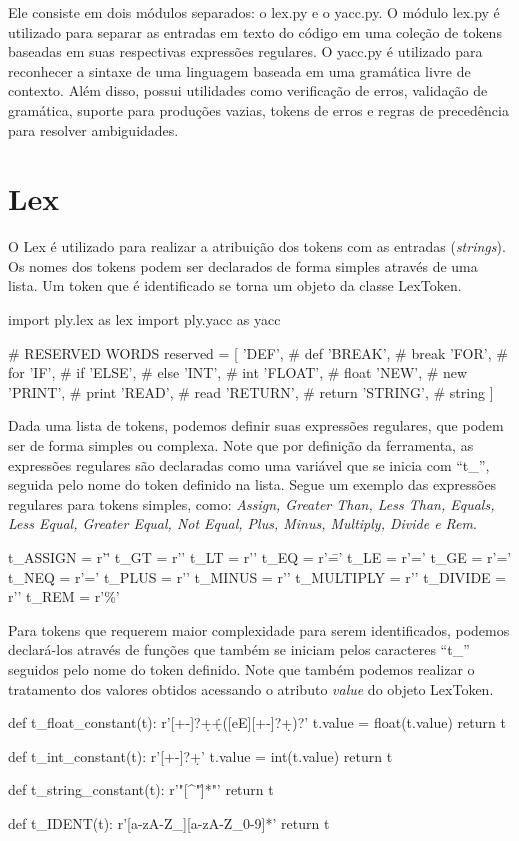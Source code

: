 \documentclass[
	12pt,				%
	openright,			%
	twoside,			%
	a4paper,			%
	english,			%
	french,				%
	spanish,			%
	brazil				%
	]{abntex2}
\begin{document}
Ele consiste em dois módulos separados: o lex.py e o yacc.py. O módulo lex.py é utilizado
para separar as entradas em texto do código em uma coleção de tokens baseadas em suas respectivas 
expressões regulares. O yacc.py é utilizado para reconhecer a sintaxe de uma linguagem 
baseada em uma gramática livre de contexto. Além disso, possui utilidades como verificação
de erros, validação de gramática, suporte para produções vazias, tokens de erros e regras de
precedência para resolver ambiguidades.

\section{Lex}
O Lex é utilizado para realizar a atribuição dos tokens com as entradas (\emph{strings}).
Os nomes dos tokens podem ser declarados de forma simples através de uma lista. Um token
que é identificado se torna um objeto da classe LexToken.
\begin{python}
import ply.lex as lex
import ply.yacc as yacc

# RESERVED WORDS
reserved = [
    'DEF',         # def
    'BREAK',       # break
    'FOR',         # for
    'IF',          # if
    'ELSE',        # else
    'INT',         # int
    'FLOAT',       # float
    'NEW',         # new
    'PRINT',       # print
    'READ',        # read
    'RETURN',      # return
    'STRING',      # string
]
\end{python}

	Dada uma lista de tokens, podemos definir suas expressões regulares, que podem
ser de forma simples ou complexa. Note que por definição da ferramenta,
as expressões regulares são declaradas como uma variável que se inicia com ``t\_'',
seguida pelo nome do token definido na lista. Segue um exemplo das expressões
regulares para tokens simples, como: \emph{Assign, Greater Than, Less Than, Equals, Less Equal,
Greater Equal, Not Equal, Plus, Minus, Multiply, Divide e Rem}.
\\
\begin{python}
t_ASSIGN = r'\='
t_GT = r'\>'
t_LT = r'\<'
t_EQ = r'\=='
t_LE = r'\<='
t_GE = r'\>='
t_NEQ = r'\!='
t_PLUS = r'\+'
t_MINUS = r'\-'
t_MULTIPLY = r'\*'
t_DIVIDE = r'\/'
t_REM = r'\%'
\end{python}

Para tokens que requerem maior complexidade para serem identificados, podemos declará-los através de funções
que também se iniciam pelos caracteres ``t\_'' seguidos pelo nome do token
definido. Note que também podemos realizar o tratamento dos valores obtidos acessando
o atributo \emph{value} do objeto LexToken.
\\
\begin{python}
def t_float_constant(t):
    r'[+-]?\d+\.\d+([eE][+-]?\d+)?'
    t.value = float(t.value)
    return t

def t_int_constant(t):
    r'[+-]?\d+'
    t.value = int(t.value)
    return t

def t_string_constant(t):
    r'"[^"\n\r]*"'
    return t

def t_IDENT(t):
    r'[a-zA-Z_][a-zA-Z_0-9]*'
    return t
\end{python}
\newpage
\end{document}
